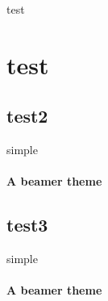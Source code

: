 \documentclass{beamer}
\begin{document}
\begin{frame}
test
\end{frame}

\section{test}
\subsection{test2}
\begin{frame}{simple}
  \framesubtitle{A beamer theme}
\end{frame}

\subsection{test3}
\begin{frame}{simple}
  \framesubtitle{A beamer theme}
\end{frame}
\end{document}
